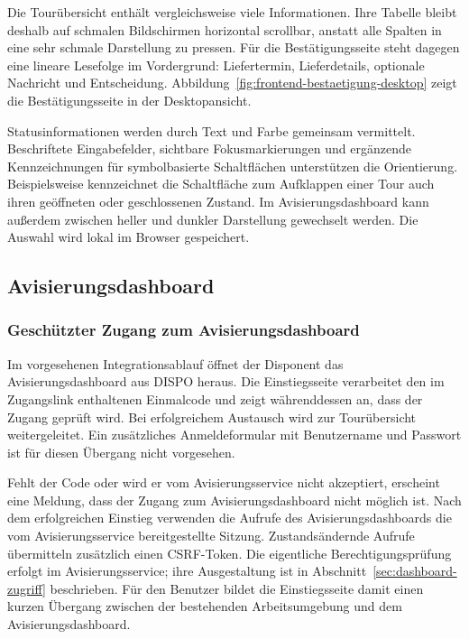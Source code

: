Die Tourübersicht enthält vergleichsweise viele Informationen. Ihre Tabelle bleibt deshalb auf
schmalen Bildschirmen horizontal scrollbar, anstatt alle Spalten in eine sehr schmale
Darstellung zu pressen. Für die Bestätigungsseite steht dagegen eine lineare Lesefolge im
Vordergrund: Liefertermin, Lieferdetails, optionale Nachricht und Entscheidung.
Abbildung~\ref{fig:frontend-bestaetigung-desktop} zeigt die Bestätigungsseite in der
Desktopansicht.

Statusinformationen werden durch Text und Farbe gemeinsam vermittelt. Beschriftete
Eingabefelder, sichtbare Fokusmarkierungen und ergänzende Kennzeichnungen für symbolbasierte
Schaltflächen unterstützen die Orientierung. Beispielsweise kennzeichnet die Schaltfläche zum
Aufklappen einer Tour auch ihren geöffneten oder geschlossenen Zustand. Im Avisierungsdashboard
kann außerdem zwischen heller und dunkler Darstellung gewechselt werden. Die Auswahl wird lokal
im Browser gespeichert.

\subsection{Avisierungsdashboard}

\subsubsection{Geschützter Zugang zum Avisierungsdashboard}

Im vorgesehenen Integrationsablauf öffnet der Disponent das Avisierungsdashboard aus DISPO
heraus. Die Einstiegsseite verarbeitet den im Zugangslink enthaltenen Einmalcode und zeigt
währenddessen an, dass der Zugang geprüft wird. Bei erfolgreichem Austausch wird zur
Tourübersicht weitergeleitet. Ein zusätzliches Anmeldeformular mit Benutzername und Passwort
ist für diesen Übergang nicht vorgesehen.

Fehlt der Code oder wird er vom Avisierungsservice nicht akzeptiert, erscheint eine Meldung,
dass der Zugang zum Avisierungsdashboard nicht möglich ist. Nach dem erfolgreichen Einstieg
verwenden die Aufrufe des Avisierungsdashboards die vom Avisierungsservice bereitgestellte
Sitzung. Zustandsändernde Aufrufe übermitteln zusätzlich einen CSRF-Token. Die eigentliche
Berechtigungsprüfung erfolgt im Avisierungsservice; ihre Ausgestaltung ist in
Abschnitt~\ref{sec:dashboard-zugriff} beschrieben. Für den Benutzer bildet die Einstiegsseite
damit einen kurzen Übergang zwischen der bestehenden Arbeitsumgebung und dem
Avisierungsdashboard.

